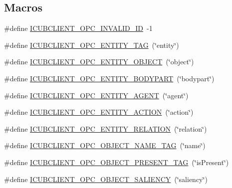 \subsection*{Macros}
\begin{DoxyCompactItemize}
\item 
\#define \hyperlink{group__icubclient__tags_ga80d7318f46a4c1bf17da02ba0f6f936c}{I\+C\+U\+B\+C\+L\+I\+E\+N\+T\+\_\+\+O\+P\+C\+\_\+\+I\+N\+V\+A\+L\+I\+D\+\_\+\+ID}~-\/1
\item 
\#define \hyperlink{group__icubclient__tags_ga246adf989288f5f86653ada9b2f802f6}{I\+C\+U\+B\+C\+L\+I\+E\+N\+T\+\_\+\+O\+P\+C\+\_\+\+E\+N\+T\+I\+T\+Y\+\_\+\+T\+AG}~(\char`\"{}entity\char`\"{})
\item 
\#define \hyperlink{group__icubclient__tags_ga6797b1b7c9fa53110a21f603348bf53b}{I\+C\+U\+B\+C\+L\+I\+E\+N\+T\+\_\+\+O\+P\+C\+\_\+\+E\+N\+T\+I\+T\+Y\+\_\+\+O\+B\+J\+E\+CT}~(\char`\"{}object\char`\"{})
\item 
\#define \hyperlink{group__icubclient__tags_ga666de2034649127f5769248dd5128c79}{I\+C\+U\+B\+C\+L\+I\+E\+N\+T\+\_\+\+O\+P\+C\+\_\+\+E\+N\+T\+I\+T\+Y\+\_\+\+B\+O\+D\+Y\+P\+A\+RT}~(\char`\"{}bodypart\char`\"{})
\item 
\#define \hyperlink{group__icubclient__tags_ga344c831a91baa7409cf3b36a7442bdb4}{I\+C\+U\+B\+C\+L\+I\+E\+N\+T\+\_\+\+O\+P\+C\+\_\+\+E\+N\+T\+I\+T\+Y\+\_\+\+A\+G\+E\+NT}~(\char`\"{}agent\char`\"{})
\item 
\#define \hyperlink{group__icubclient__tags_gad6e55b5401c42245181a281f2f23d405}{I\+C\+U\+B\+C\+L\+I\+E\+N\+T\+\_\+\+O\+P\+C\+\_\+\+E\+N\+T\+I\+T\+Y\+\_\+\+A\+C\+T\+I\+ON}~(\char`\"{}action\char`\"{})
\item 
\#define \hyperlink{group__icubclient__tags_ga63567df332a352a66e65b1021fa66502}{I\+C\+U\+B\+C\+L\+I\+E\+N\+T\+\_\+\+O\+P\+C\+\_\+\+E\+N\+T\+I\+T\+Y\+\_\+\+R\+E\+L\+A\+T\+I\+ON}~(\char`\"{}relation\char`\"{})
\item 
\#define \hyperlink{group__icubclient__tags_ga17c3e72813939920bd142684f2d27c33}{I\+C\+U\+B\+C\+L\+I\+E\+N\+T\+\_\+\+O\+P\+C\+\_\+\+O\+B\+J\+E\+C\+T\+\_\+\+N\+A\+M\+E\+\_\+\+T\+AG}~(\char`\"{}name\char`\"{})
\item 
\#define \hyperlink{group__icubclient__tags_gaf84913eb724cfedc5aa98b2d9d3c400e}{I\+C\+U\+B\+C\+L\+I\+E\+N\+T\+\_\+\+O\+P\+C\+\_\+\+O\+B\+J\+E\+C\+T\+\_\+\+P\+R\+E\+S\+E\+N\+T\+\_\+\+T\+AG}~(\char`\"{}is\+Present\char`\"{})
\item 
\#define \hyperlink{group__icubclient__tags_gab5ed34a21997411cf2405c5463e31e24}{I\+C\+U\+B\+C\+L\+I\+E\+N\+T\+\_\+\+O\+P\+C\+\_\+\+O\+B\+J\+E\+C\+T\+\_\+\+S\+A\+L\+I\+E\+N\+CY}~(\char`\"{}saliency\char`\"{})

\end{DoxyCompactItemize}
